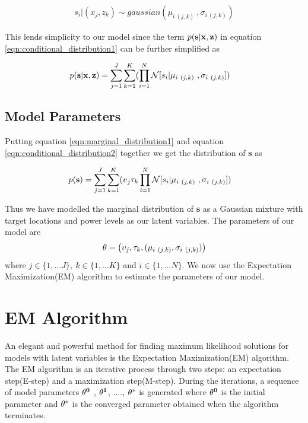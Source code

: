 \documentclass{Localization-PaperWriteupDraft}
\begin{document}
\begin{align}
s_{i} | ({x_{j}}, {z_{k}})  \sim  gaussian (\mu_{i \ (j,k)} \ , \sigma_{i \ (j,k)})
\end{align}

This lends simplicity to our model since the term $p( {\bf s} | {\bf x}, {\bf z})$ in equation
\ref{eqn:conditional_distribution1} can be further simplified as 

\begin{align}
p( {\bf s} | {\bf x}, {\bf z}) & =  \sum_{j=1}^J \sum_{k=1}^K (
		\prod_{i=1}^N {\it \mathcal  N}[ {s_{i}} | \mu_{i \ (j,k)} \ ,
		\sigma_{i \ (j,k)}] ) \label{eqn:conditional_distribution2}
\end{align}

\subsection{Model Parameters}
\label{subsec:modelparameters}

Putting equation \ref{eqn:marginal_distribution1} and equation
\ref{eqn:conditional_distribution2} together we get the distribution of
{\bf s} as

\begin{align}
p( {\bf s}) &= \sum_{j=1}^J \sum_{k=1}^K ( \upsilon_{j} \tau_{k} \prod_{i=1}^N {\it \mathcal  N}[ {s_{i}} | \mu_{i \ (j,k)} \ ,
		\sigma_{i \ (j,k)}] )
\end{align}

Thus we have modelled the marginal distribution of {\bf s} as a Gaussian
mixture with target locations and power levels as our latent variables. The parameters of our model are 
\begin{align}
{\bf \theta} = \left( \upsilon_{j} , \tau_{k}, (\mu_{i \ (j,k)} , \sigma_{i \ (j,k)} )\right)
\end{align}
where $j\in\{1,...J\},\ k \in\{1,...K\}$ and $i\in \{1,...N\}$. We now use the  Expectation Maximization(EM) algorithm to estimate the parameters of our model.

\section{EM Algorithm}
\label{sec:emalgorithm}

An elegant and powerful method for finding maximum likelihood solutions
for models with latent variables is the Expectation Maximization(EM)
	algorithm. The EM algorithm is an iterative process through two
	steps: an expectation step(E-step) and a maximization step(M-step). During the iterations, a sequence of model parameters ${\bf \theta^{0}}$
, ${\bf \theta^{1}}$, ...., ${\bf \theta^{*}}$ is generated where ${\bf \theta^{0}}$ is the initial parameter and ${\bf \theta^{*}}$ is the converged parameter obtained when the algorithm terminates.
\end{document}
